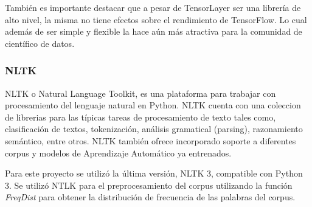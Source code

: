 \documentclass[12pt, letterpaper]{article}
\begin{document}
        También es importante destacar que a pesar de TensorLayer ser una librería de alto nivel, la misma no tiene efectos sobre el rendimiento de TensorFlow. Lo cual además de ser simple y flexible la hace aún más atractiva para la comunidad de científico de datos\cite{tensorlayer2017}.

        \subsubsection{NLTK}
        NLTK o Natural Language Toolkit, es una plataforma para trabajar con procesamiento del lenguaje natural en Python. NLTK cuenta con una coleccion de librerias para las típicas tareas de procesamiento de texto tales como, clasificación de textos, tokenización, análisis gramatical (parsing), razonamiento semántico, entre otros. NLTK también ofrece incorporado soporte a diferentes corpus y modelos de Aprendizaje Automático ya entrenados\cite{nltk}. 
        
        Para este proyecto se utilizó la última versión, NLTK 3, compatible con Python 3. Se utilizó NTLK para el preprocesamiento del corpus utilizando la función \emph{FreqDist} para obtener la distribución de frecuencia de las palabras del corpus.
\end{document}
